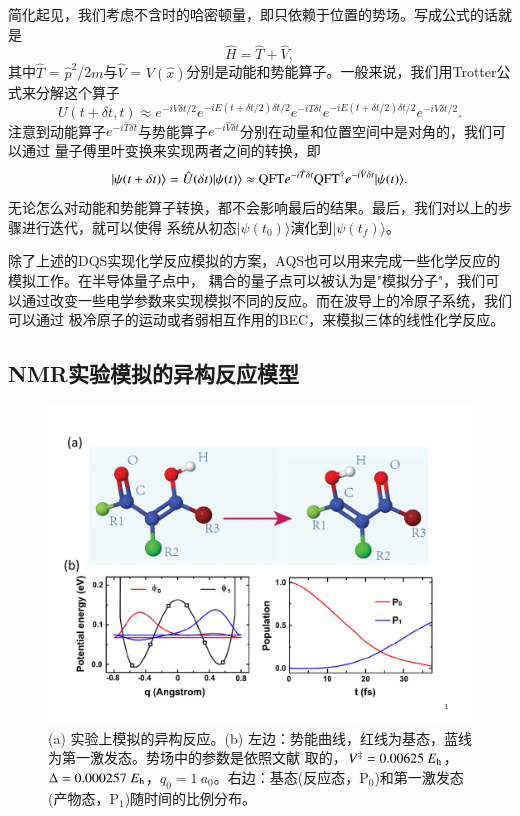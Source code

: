简化起见，我们考虑不含时的哈密顿量，即只依赖于位置的势场。写成公式的话就是
\begin{equation}
\hat{H} = \hat{T}+ \hat{V},
\end{equation}
其中$\hat{T}$ = $\hat{p}^{2}$/2$m$与$\hat{V}$ = $V(\hat{x})$分别是动能和势能算子。一般来说，我们用Trotter公式来分解这个算子
\begin{equation}
 {U}(t+\delta t,t)\approx  e^{-i {V} \delta t/2} e^{-i {E} (t+\delta t/2)  \delta t/2}
 e^{-i {T} \delta t}    e^{-i {E} (t+\delta t/2)           \delta t/2}
 e^{-i {V} \delta t/2} .
\end{equation}
注意到动能算子$e^{ - i \hat{T} \delta t}$与势能算子$e^{ - i \hat{V} \delta t}$分别在动量和位置空间中是对角的，我们可以通过
量子傅里叶变换来实现两者之间的转换，即
\begin{equation}
|\psi (t+\delta t)\rangle  = \hat U(\delta t)|\psi (t)\rangle
  \approx {\rm{QFT}}{e^{-i\hat T\delta t}}
  {\rm{QF}}{{\rm{T}}^{\rm{\dag}}}{e^{-i\hat V\delta t}}|\psi (t)\rangle.
\end{equation}
无论怎么对动能和势能算子转换，都不会影响最后的结果。最后，我们对以上的步骤进行迭代，就可以使得
系统从初态$|\psi(t_0) \rangle$演化到$|\psi(t_f) \rangle$。

除了上述的DQS实现化学反应模拟的方案，AQS也可以用来完成一些化学反应的模拟工作。在半导体量子点\cite{reaction}中，
耦合的量子点可以被认为是"模拟分子"，我们可以通过改变一些电学参数来实现模拟不同的反应。而在波导上的冷原子系统\cite{chem3}，我们可以通过
极冷原子的运动或者弱相互作用的BEC，来模拟三体的线性化学反应。

 \subsection{NMR实验模拟的异构反应模型}

  \begin{figure}[htbp]
            \begin{center}
              \includegraphics[width= 0.8\columnwidth]{figures/nmrreaction.pdf}
              \caption{(a) 实验上模拟的异构反应。(b) 左边：势能曲线，红线为基态，蓝线为第一激发态。势场中的参数是依照文献\cite{nmrdym1}
              取的，$V^\ddag=0.00625\ E_{\rm h}$，$\Delta=0.000257\ E_{\rm h}$，$q_0=1\ a_0$。右边：基态(反应态，P$_0$)和第一激发态(产物态，P$_1$)随时间的比例分布。}\label{nmrreaction}
            \end{center}
 \end{figure}

